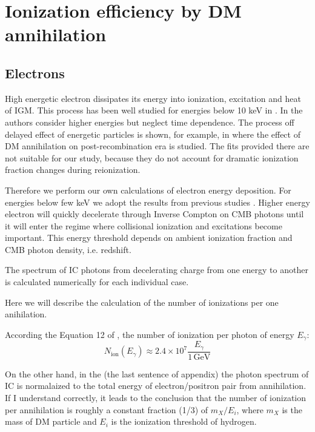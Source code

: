 \section{Ionization efficiency by DM annihilation}
\label{sec:DMspectrum}

\subsection{Electrons}

High energetic electron dissipates its energy into ionization, excitation and heat of IGM. This process has been well studied for energies below 10 keV in \cite{Shull_1979,Shull_1985,Dalgarno_1999,Furlanetto_2010}. In \cite{Vald_s_2010} the authors consider higher energies but neglect time dependence. The process off delayed effect of energetic particles is shown, for example, in \cite{2015arXiv150603812S} where the effect of DM annihilation on post-recombination era is studied. The fits provided there are not suitable for our study, because they do not account for dramatic ionization fraction changes during reionization.

Therefore we perform our own calculations of electron energy deposition. For energies below few keV we adopt the results from previous studies \cite{Shull_1985,Furlanetto_2010}. Higher energy electron will quickly decelerate through Inverse Compton on CMB photons until it will enter the regime where collisional ionization and excitations become important. This energy threshold depends on ambient ionization fraction and CMB photon density, i.e. redshift.

The spectrum of IC photons from decelerating charge from one energy to another is calculated numerically for each individual case.

Here we will describe the calculation of the number of ionizations per one anihilation.

According the Equation 12 of \cite{Belikov_2009}, the number of ionization per photon of energy $E_\gamma$:
\begin{equation}
N_\mathrm{ion}(E_\gamma) \approx 2.4\times10^7\dfrac{E_\gamma}{1\,\mathrm{GeV}}
\end{equation}

On the other hand, in the \cite{Belikov_2010} (the last sentence of appendix) the photon spectrum of IC is normalaized to the total energy of electron/positron pair from annihilation. If I understand correctly, it leads to the conclusion that the number of ionization per annihilation is roughly a constant fraction (1/3) of $m_X/E_i$, where $m_X$ is the mass of DM particle and $E_i$ is the ionization threshold of hydrogen.
    
    
    
  